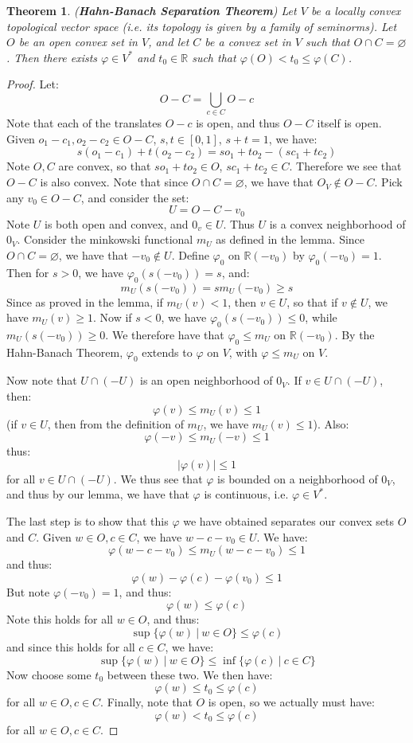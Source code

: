 \documentclass[a4paper,12pt]{report}
\newcommand{\vphi} {\varphi}
\newtheorem{theorem}{Theorem}[section]
\begin{document}
	\begin{theorem}
	\emph{(\textbf{Hahn-Banach Separation Theorem})}
	Let $V$ be a locally convex topological vector space (i.e. its topology is given by a family of seminorms). Let $O$ be an open convex set in $V$, and let $C$ be a convex set in $V$ such that $O \cap C = \varnothing$. Then there exists $\vphi \in V^*$ and  $t_0 \in \mathbb{R}$ such that $\vphi(O) < t_0 \leq \vphi(C)$. 
	\end{theorem}
	\begin{proof}
	Let:
	\[ O - C = \bigcup_{c \in C} O - c \]
	Note that each of the translates $O - c$ is open, and thus $O - C$ itself is open. Given $o_1 - c_1, o_2 - c_2 \in O - C$, $s, t \in [0, 1]$, $s + t = 1$, we have:
	\[ s(o_1 - c_1) + t(o_2 - c_2) = so_1 + to_2 -(sc_1 + tc_2) \]
	Note $O, C$ are convex, so that $so_1 + to_2 \in O$, $sc_1 + tc_2 \in C$. Therefore we see that $O - C$ is also convex. Note that since $O \cap C = \varnothing$, we have that $O_V \notin O - C$. Pick any $v_0 \in O - C$, and consider the set:
	\[ U = O - C - v_0 \]
	Note $U$ is both open and convex, and $0_v \in U$. Thus $U$ is a convex neighborhood of $0_V$. Consider the minkowski functional $m_U$ as defined in the lemma. Since $O \cap C = \varnothing$, we have that $-v_0 \notin U$. Define $\vphi_0$ on $\mathbb{R}(-v_0)$ by $\vphi_0(-v_0) = 1$. Then for $s > 0$, we have $\vphi_0(s(-v_0)) = s$, and:
	\[ m_U(s(-v_0)) = sm_U(-v_0) \geq s \]
	Since as proved in the lemma, if $m_U(v) < 1$, then $v \in U$, so that if $v \notin U$, we have $m_U(v) \geq 1$. Now if $s < 0$, we have $\vphi_0(s(-v_0)) \leq 0$, while $m_U(s(-v_0)) \geq 0$. We therefore have that $\vphi_0 \leq m_U$ on $\mathbb{R}(-v_0)$. By the Hahn-Banach Theorem, $\vphi_0$ extends to $\vphi$ on $V$, with $\vphi \leq m_U$ on $V$. 
	
	Now note that $U \cap (-U)$ is an open neighborhood of $0_V$. If $v \in U \cap (-U)$, then:
	\[ \vphi(v) \leq m_U(v) \leq 1 \]
	(if $v \in U$, then from the definition of $m_U$, we have $m_U(v) \leq 1$). Also:
	\[ \vphi(-v) \leq m_U(-v) \leq 1 \]
	thus:
	\[ |\vphi(v)| \leq 1 \]
	for all $v \in U \cap (-U)$. We thus see that $\vphi$ is bounded on a neighborhood of $0_V$, and thus by our lemma, we have that $\vphi$ is continuous, i.e. $\vphi \in V^*$. 
	
	The last step is to show that this $\vphi$ we have obtained separates our convex sets $O$ and $C$. Given $w \in O, c \in C$, we have $w - c - v_0 \in U$. We have:
	\[ \vphi(w - c - v_0) \leq m_U(w - c - v_0) \leq 1 \]
	and thus:
	\[ \vphi(w) - \vphi(c) - \vphi(v_0) \leq 1 \]
	But note $\vphi(-v_0) = 1$, and thus:
	\[ \vphi(w) \leq \vphi(c) \]
	Note this holds for all $w \in O$, and thus:
	\[ \sup \big\{ \vphi(w) ~|~ w \in O \big\} \leq \vphi(c) \]
	and since this holds for all $c \in C$, we have:
	\[ \sup \big\{ \vphi(w) ~|~ w \in O \big\} \leq \inf \big\{ \vphi(c) ~|~ c \in C \big\} \]
	Now choose some $t_0$ between these two. We then have:
	\[ \vphi(w) \leq t_0 \leq \vphi(c) \]
	for all $w \in O, c \in C$. Finally, note that $O$ is open, so we actually must have:
	\[ \vphi(w) < t_0 \leq \vphi(c) \]
	for all $w \in O, c \in C$.	
	\end{proof}
	
\end{document}
